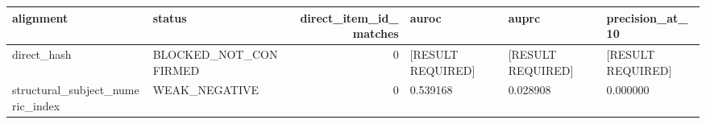\begin{tabular}{llrlll}
\toprule
alignment & status & direct\_item\_id\_matches & auroc & auprc & precision\_at\_10 \\
\midrule
direct\_hash & BLOCKED\_NOT\_CONFIRMED & 0 & [RESULT REQUIRED] & [RESULT REQUIRED] & [RESULT REQUIRED] \\
structural\_subject\_numeric\_index & WEAK\_NEGATIVE & 0 & 0.539168 & 0.028908 & 0.000000 \\
\bottomrule
\end{tabular}
